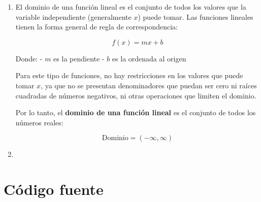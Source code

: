 \documentclass{article} %
\begin{document}
\begin{enumerate}
    \item El dominio de una función lineal es el conjunto de todos
    los valores que la variable independiente (generalmente \( x \))
    puede tomar. Las funciones lineales tienen la forma general de regla de correspondencia:

\[
f(x) = mx + b
\]

Donde:
- \( m \) es la pendiente
- \( b \) es la ordenada al origen

Para este tipo de funciones, no hay restricciones en los valores
que puede tomar \( x \), ya que no se presentan denominadores que
puedan ser cero ni raíces cuadradas de números negativos, ni otras
operaciones que limiten el dominio.

Por lo tanto, el \textbf{dominio de una función lineal} es el
conjunto de todos los números reales:

\[
\text{Dominio} = (-\infty, \infty)
\]

    \item
\end{enumerate}

\newpage
\section*{Código fuente}
\inputminted{latex}{main.tex}
\end{document}
